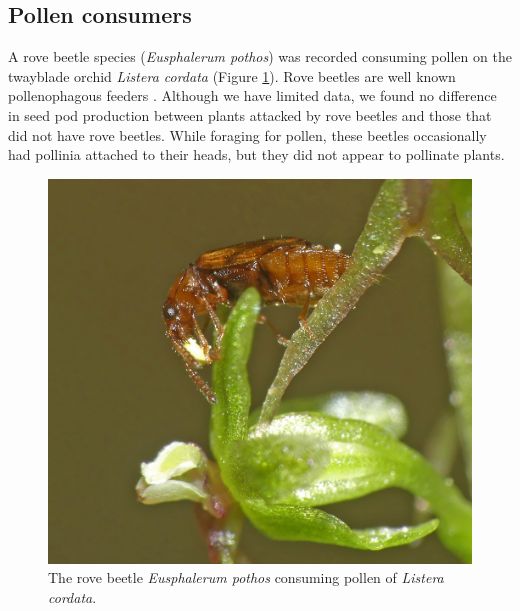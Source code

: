 \begin{multicols}{2} 



\subsection{Pollen consumers}

A rove beetle species (\emph{Eusphalerum pothos}) was recorded consuming
pollen on the twayblade orchid \emph{Listera cordata} (Figure \ref{Listera_cordata_Eusphalerum_pothos}). Rove
beetles are well known pollenophagous feeders \citep{Sayersetal2019}.
Although we have limited data, we found no difference in seed pod
production between plants attacked by rove beetles and those that did
not have rove beetles. While foraging for pollen, these beetles
occasionally had pollinia attached to their heads, but they did not
appear to pollinate plants.

\begin{figure}[H]
\begin{center}
\vspace{2mm}
\includegraphics[width=\textwidth]{img/Listera_cordata_Eusphalerum_pothos.jpg}
\caption{The rove beetle \emph{Eusphalerum pothos} consuming pollen of \emph{Listera cordata}.}
\label{Listera_cordata_Eusphalerum_pothos}
\end{center}
\end{figure}




\end{multicols}
